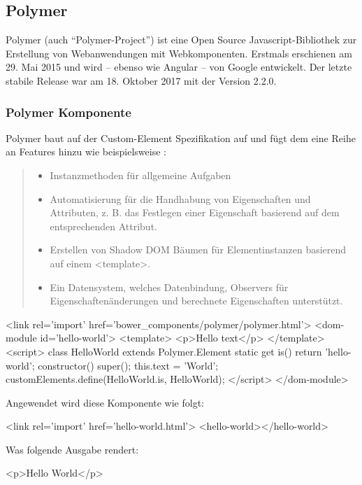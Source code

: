 \subsection{Polymer }
Polymer (auch "`Polymer-Project"') ist eine Open Source Javascript-Bibliothek zur Erstellung von Webanwendungen mit Webkomponenten. Erstmals erschienen am 29. Mai 2015 und  wird -- ebenso wie Angular -- von Google entwickelt. Der letzte stabile Release war am 18. Oktober 2017 mit der Version 2.2.0.\\

\subsubsection{Polymer Komponente}
Polymer baut auf der Custom-Element Spezifikation auf und fügt dem eine Reihe an Features hinzu wie beispielsweise \cite{polymer-elements}:
\begin{quote}
	\begin{itemize}
		\item Instanzmethoden für allgemeine Aufgaben
		\item Automatisierung für die Handhabung von Eigenschaften und Attributen, z. B. das Festlegen einer Eigenschaft basierend auf dem entsprechenden Attribut.
		\item Erstellen von Shadow DOM Bäumen für Elementinstanzen basierend auf einem <template>.
		\item Ein Datensystem, welches Datenbindung, Observers für Eigenschaftenänderungen und berechnete Eigenschaften unterstützt.
	\end{itemize}
\end{quote}
\begin{JsCode}
	<link rel='import' href='bower_components/polymer/polymer.html'>
	<dom-module id='hello-world'>
	<template>
	<p>Hello {{text}}</p>
	</template>
	<script>
	class HelloWorld extends Polymer.Element {
		static get is() {
			return 'hello-world';
		}
		constructor() {
			super();
			this.text = 'World';
		}
	}
	customElements.define(HelloWorld.is, HelloWorld);
	</script>
	</dom-module>
\end{JsCode}
Angewendet wird diese Komponente wie folgt:
\begin{JsCode}[numbers=none]
	<link rel='import' href='hello-world.html'>
	<hello-world></hello-world>
\end{JsCode}
Was folgende Ausgabe rendert:
\begin{JsCode}Hello World</p>
\end{JsCode}

